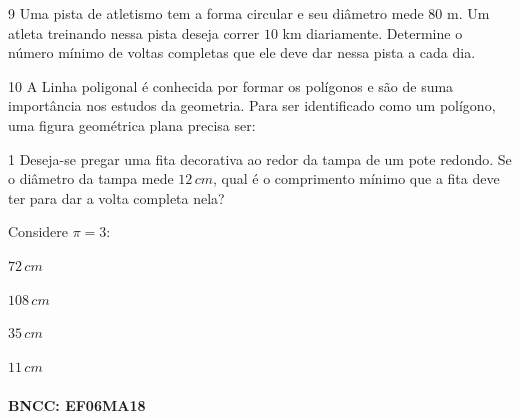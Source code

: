 

\num{9}  Uma pista de atletismo tem a forma circular e seu diâmetro mede $80$ m.
Um atleta treinando nessa pista deseja correr $10$ km diariamente.
Determine o número mínimo de voltas completas que ele deve dar nessa
pista a cada dia.


\num{10} A Linha poligonal é conhecida por formar os polígonos e são de suma
importância nos estudos da geometria. Para ser identificado como um
polígono, uma figura geométrica plana precisa ser:



\num{1}  Deseja-se pregar uma fita decorativa ao redor da tampa de um pote
redondo. Se o diâmetro da tampa mede $12\,cm$, qual é o comprimento mínimo
que a fita deve ter para dar a volta completa nela?

Considere $π = 3$:

\begin{escolha}
\item $72\,cm$
\item $108\,cm$
\item $35\,cm$
\item $11\,cm$
\end{escolha}

\paragraph{BNCC: EF06MA18 }


